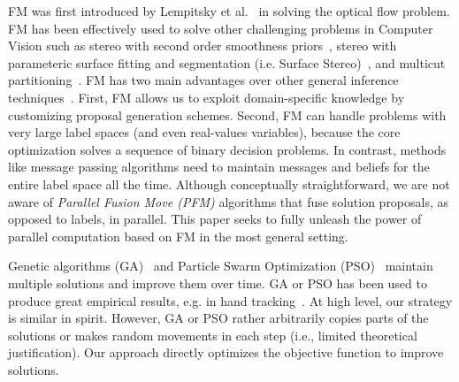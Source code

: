 
\noindent FM was first introduced by Lempitsky et al.~\cite{fusion_flow}
in solving the optical flow problem. FM has been effectively used to
solve other challenging problems in Computer Vision such as stereo with
second order smoothness priors~\cite{second_order_stereo}, stereo with
parameteric surface fitting and segmentation (i.e. Surface
Stereo)~\cite{surface_stereo}, and multicut
partitioning~\cite{fusion_moves_for_correlation_clustering}.
%
FM has two main advantages over other general inference
techniques~\cite{TRW-S,loopy_belief_propagation}. First, FM allows us to
exploit domain-specific knowledge by customizing proposal generation
schemes. Second, FM can handle problems with very large label spaces
(and even real-values variables), because the core optimization
solves a sequence of binary decision problems.
%
In contrast, methods like message passing algorithms need to maintain
messages and beliefs for the entire label space all the time.
%
Although conceptually straightforward, we are not aware of {\it Parallel
  Fusion Move (PFM)} algorithms that fuse solution proposals, as opposed to
labels, in parallel. This paper seeks to fully unleash the power of
parallel computation based on FM in the most general setting.



\noindent
Genetic algorithms (GA)~\cite{ga} and Particle Swarm
Optimization (PSO)~\cite{pso} maintain multiple solutions and improve
them over time.
%
GA or PSO has been used to produce great empirical results,
e.g. in hand tracking~\cite{pushmeet_hand_tracking}.
%
At high level, our strategy is similar in spirit. However, GA or PSO
rather arbitrarily copies parts of the solutions or makes random movements
in each step (i.e., limited theoretical justification).
%
Our approach directly optimizes the objective function to improve
solutions.


